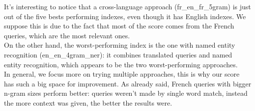 It's interesting to notice that a cross-language approach (fr\_en\_fr\_5gram) is just out of the five bests performing indexes, even though it has English indexes. We suppose this is due to the fact that most of the score comes from the French queries, which are the most relevant ones.\\
On the other hand, the worst-performing index is the one with named entity recognition (en\_en\_4gram\_ner): it combines translated queries and named entity recognition, which appears to be the two worst-performing approaches.\\
In general, we focus more on trying multiple approaches, this is why our score has such a big space for improvement. As already said, French queries with bigger n-gram sizes perform better: queries weren't made by single word match, instead the more context was given, the better the results were.\\
